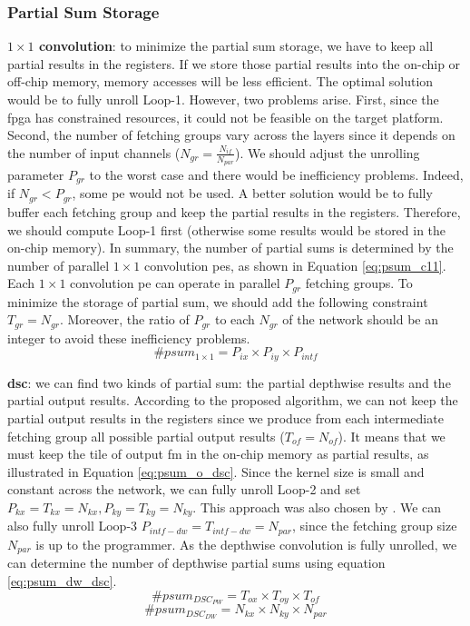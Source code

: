 \subsubsection{Partial Sum Storage}
%
\textbf{$1 \times 1$ convolution}: to minimize the partial sum storage, we have to keep all partial results in the registers. If we store those partial results into the on-chip or off-chip memory, memory accesses will be less efficient. The optimal solution would be to fully unroll Loop-1. However, two problems arise. First, since the \acrshort{fpga} has constrained resources, it could not be feasible on the target platform. Second, the number of fetching groups vary across the layers since it depends on the number of input channels ($N_{gr} = \frac{N_{if}}{N_{par}}$). We should adjust the unrolling parameter $P_{gr}$ to the worst case and there would be inefficiency problems. Indeed, if $N_{gr} < P_{gr}$, some \acrshort{pe} would not be used. A better solution would be to fully buffer each fetching group and keep the partial results in the registers. Therefore, we should compute Loop-1 first (otherwise some results would be stored in the on-chip memory).
In summary, the number of partial sums is determined by the number of parallel $1 \times 1$ convolution \acrshort{pe}s, as shown in Equation \eqref{eq:psum_c11}. Each $1 \times 1$ convolution \acrshort{pe} can operate in parallel $P_{gr}$ fetching groups. To minimize the storage of partial sum, we should add the following constraint $T_{gr} = N_{gr}$. Moreover, the ratio of $P_{gr}$ to each $N_{gr}$ of the network should be an integer to avoid these inefficiency problems.
%
\begin{equation}
    \# psum_{1 \times 1} = P_{ix} \times P_{iy} \times P_{intf}
    \label{eq:psum_c11}
\end{equation}

\textbf{\acrshort{dsc}}: we can find two kinds of partial sum: the partial depthwise results and the partial output results. According to the proposed algorithm, we can not keep the partial output results in the registers since we produce from each intermediate fetching group all possible partial output results ($T_{of} = N_{of}$). It means that we must keep the tile of output \acrshort{fm} in the on-chip memory as partial results, as illustrated in Equation \eqref{eq:psum_o_dsc}. Since the kernel size is small and constant across the network, we can fully unroll Loop-2 and set $P_{kx} = T_{kx} = N_{kx}, P_{ky} = T_{ky} = N_{ky}$. This approach was also chosen by \textcite{motamedi_placid_2017}. We can also fully unroll Loop-3 $P_{intf-dw} = T_{intf-dw} = N_{par}$, since the fetching group size $N_{par}$ is up to the programmer. As the depthwise convolution is fully unrolled, we can determine the number of depthwise partial sums using equation \eqref{eq:psum_dw_dsc}.
%
\begin{equation}
    \# psum_{DSC_{PW}} = T_{ox} \times T_{oy} \times T_{of}
    \label{eq:psum_o_dsc}
\end{equation}
%
\begin{equation}
    \# psum_{DSC_{DW}} = N_{kx} \times N_{ky} \times N_{par}
    \label{eq:psum_dw_dsc}
\end{equation}
%
